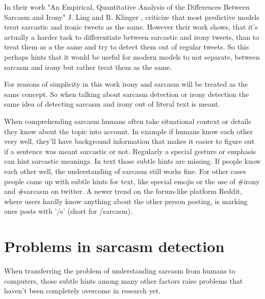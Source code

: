 \documentclass[sigconf,  review=false, nonacm=true]{acmart}
\begin{document}
In their work "An Empirical, Quantitative Analysis of the Differences Between Sarcasm and Irony" J. Ling and R. Klinger \cite{diff_irony_sarcasm}, criticize that most predictive models treat sarcastic and ironic tweets as the same. However their work shows, that it's actually a harder task to differentiate between sarcastic and irony tweets, than to treat them as a the same and try to detect them out of regular tweets. So this perhaps hints that it would be useful for modern models to not separate, between sarcasm and irony but rather treat them as the same. 

For reasons of simplicity in this work irony and sarcasm will be treated as the same concept. So when talking about sarcasm detection or irony detection the same idea of detecting sarcasm and irony out of literal text is meant.

When comprehending sarcasm humans often take situational context or details they know about the topic into account. In example if humans know each other very well, they'll have background information that makes it easier to figure out if a sentence was meant sarcastic or not. Regularly a special gesture or emphasis can hint sarcastic meanings. In text those subtle hints are missing. If people know each other well, the understanding of sarcasm still works fine. For other cases people came up with subtle hints for text, like special emojis or the use of \#irony and \#sarcasm on twitter.  A newer trend on the forum-like platform Reddit, where users hardly know anything about the other person posting, is marking ones posts with '/s' (short for /sarcasm). 


\section{Problems in sarcasm detection}

When transferring the problem of understanding sarcasm from humans to computers, those subtle hints among many other factors raise problems that haven't been completely overcome in research yet. 
\end{document}
